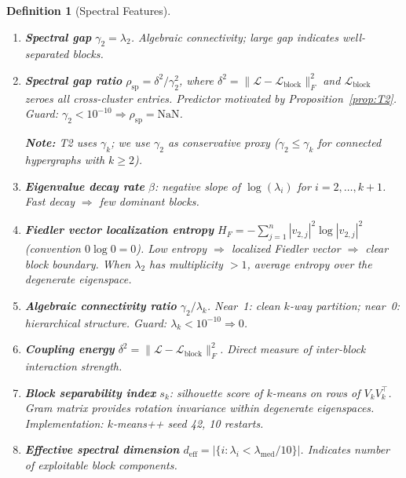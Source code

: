 \documentclass[12pt]{article}
\newtheorem{definition}[theorem]{Definition}
\begin{document}
\begin{definition}[Spectral Features]
\label{def:spectral-features}
\begin{enumerate}[label=\textbf{SF\arabic*.}]
\item \textbf{Spectral gap} $\gamma_2 = \lambda_2$.
  Algebraic connectivity; large gap indicates well-separated blocks.

\item \textbf{Spectral gap ratio} $\rho_{\mathrm{sp}} = \delta^2 / \gamma_2^2$,
  where $\delta^2 = \|\mathcal{L} - \mathcal{L}_{\mathrm{block}}\|_F^2$ and
  $\mathcal{L}_{\mathrm{block}}$ zeroes all cross-cluster entries.
  Predictor motivated by Proposition~\ref{prop:T2}.
  \emph{Guard:} $\gamma_2 < 10^{-10} \Rightarrow \rho_{\mathrm{sp}} = \mathrm{NaN}$.

  \textbf{Note:} T2 uses $\gamma_k$; we use $\gamma_2$ as conservative proxy
  ($\gamma_2 \leq \gamma_k$ for connected hypergraphs with $k \geq 2$).

\item \textbf{Eigenvalue decay rate} $\beta$: negative slope of
  $\log(\lambda_i)$ for $i = 2, \ldots, k+1$.  Fast decay $\Rightarrow$ few dominant blocks.

\item \textbf{Fiedler vector localization entropy}
  $H_F = -\sum_{j=1}^{n} |v_{2,j}|^2 \log |v_{2,j}|^2$ (convention $0 \log 0 = 0$).
  Low entropy $\Rightarrow$ localized Fiedler vector $\Rightarrow$ clear block boundary.
  When $\lambda_2$ has multiplicity $> 1$, average entropy over the degenerate eigenspace.

\item \textbf{Algebraic connectivity ratio} $\gamma_2 / \lambda_k$.
  Near~1: clean $k$-way partition; near~0: hierarchical structure.
  \emph{Guard:} $\lambda_k < 10^{-10} \Rightarrow 0$.

\item \textbf{Coupling energy} $\delta^2 = \|\mathcal{L} - \mathcal{L}_{\mathrm{block}}\|_F^2$.
  Direct measure of inter-block interaction strength.

\item \textbf{Block separability index} $s_k$: silhouette score of
  $k$-means on rows of $V_k V_k^\top$.
  Gram matrix provides rotation invariance within degenerate eigenspaces.
  Implementation: $k$-means++ seed 42, 10 restarts.

\item \textbf{Effective spectral dimension}
  $d_{\mathrm{eff}} = |\{i : \lambda_i < \lambda_{\mathrm{med}} / 10\}|$.
  Indicates number of exploitable block components.
\end{enumerate}
\end{definition}
\end{document}

